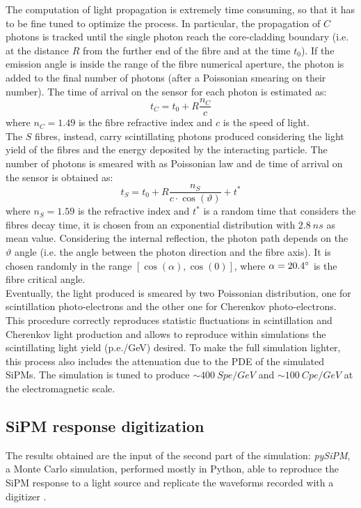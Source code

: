 The computation of light propagation is extremely time consuming, so that it has to be fine tuned to optimize the process. In particular, the propagation of $C$ photons is tracked until the single photon reach the core-cladding boundary (i.e. at the distance $R$ from the further end of the fibre and at the time $t_0$). If the emission angle is inside the range of the fibre numerical aperture, the photon is added to the final number of photons (after a Poissonian smearing on their number).
The time of arrival on the sensor for each photon is estimated as:
\begin{equation}
t_C = t_0 + R \frac{n_C}{c}
\end{equation}
where $n_C = 1.49$ is the fibre refractive index and $c$ is the speed of light.\\

The $S$ fibres, instead, carry scintillating photons produced considering the light yield of the fibres and the energy deposited by the interacting particle. The number of photons is smeared with as Poissonian law and de time of arrival on the sensor is obtained as:
\begin{equation}
	t_S = t_0 + R\frac{n_S}{c\cdot \cos(\vartheta)} + t^*
\end{equation}
where $n_S = 1.59$ is the refractive index and $t^*$ is a random time that considers the fibres decay time, it is chosen from an exponential distribution with $2.8\ ns$ as mean value.
Considering the internal reflection, the photon path depends on the $\vartheta$ angle (i.e. the angle between the photon direction and the fibre axis). It is chosen randomly in the range $[\cos(\alpha),\cos(0)]$, where $\alpha = 20.4\degree$ is the fibre critical angle.\\
Eventually, the light produced is smeared by two Poissonian distribution, one for scintillation photo-electrons and the other one for Cherenkov photo-electrons. This procedure correctly reproduces statistic fluctuations in scintillation and Cherenkov light production and allows to reproduce within simulations the scintillating light yield (p.e./GeV) desired. To make the full simulation lighter, this process also includes the attenuation due to the PDE of the simulated SiPMs. The simulation is tuned to produce $\sim 400\ Spe/GeV$ and $\sim 100\ Cpe/GeV$ at the electromagnetic scale.

\subsection{SiPM response digitization} \label{subsec:Sim_SiPM}
The results obtained are the input of the second part of the simulation: \textit{pySiPM}, a Monte Carlo simulation, performed mostly in Python, able to reproduce the SiPM response to a light source and replicate the waveforms recorded with a digitizer \cite{digitizer}.\\

